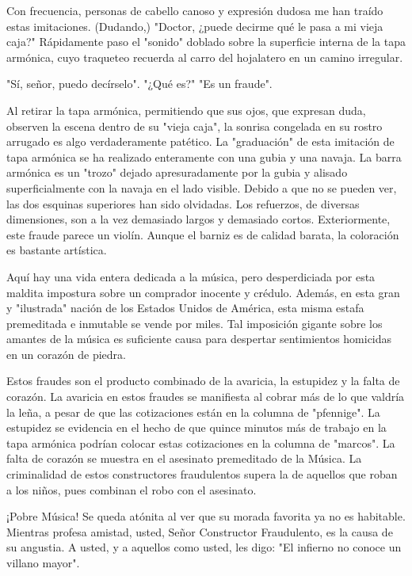 \documentclass[12pt]{book}
\begin{document}
Con frecuencia, personas de cabello canoso y expresión dudosa me han traído estas imitaciones. (Dudando,) "Doctor, ¿puede decirme qué le pasa a mi vieja caja?" Rápidamente paso el "sonido" doblado sobre la superficie interna de la tapa armónica, cuyo traqueteo recuerda al carro del hojalatero en un camino irregular.

"Sí, señor, puedo decírselo". "¿Qué es?" "Es un fraude".

Al retirar la tapa armónica, permitiendo que sus ojos, que expresan duda, observen la escena dentro de su "vieja caja", la sonrisa congelada en su rostro arrugado es algo verdaderamente patético. La "graduación" de esta imitación de tapa armónica se ha realizado enteramente con una gubia y una navaja. La barra armónica es un "trozo" dejado apresuradamente por la gubia y alisado superficialmente con la navaja en el lado visible. Debido a que no se pueden ver, las dos esquinas superiores han sido olvidadas. Los refuerzos, de diversas dimensiones, son a la vez demasiado largos y demasiado cortos. Exteriormente, este fraude parece un violín. Aunque el barniz es de calidad barata, la coloración es bastante artística.

Aquí hay una vida entera dedicada a la música, pero desperdiciada por esta maldita impostura sobre un comprador inocente y crédulo. Además, en esta gran y "ilustrada" nación de los Estados Unidos de América, esta misma estafa premeditada e inmutable se vende por miles. Tal imposición gigante sobre los amantes de la música es suficiente causa para despertar sentimientos homicidas en un corazón de piedra.

Estos fraudes son el producto combinado de la avaricia, la estupidez y la falta de corazón. La avaricia en estos fraudes se manifiesta al cobrar más de lo que valdría la leña, a pesar de que las cotizaciones están en la columna de "pfennige". La estupidez se evidencia en el hecho de que quince minutos más de trabajo en la tapa armónica podrían colocar estas cotizaciones en la columna de "marcos". La falta de corazón se muestra en el asesinato premeditado de la Música. La criminalidad de estos constructores fraudulentos supera la de aquellos que roban a los niños, pues combinan el robo con el asesinato.\newline

¡Pobre Música! Se queda atónita al ver que su morada favorita ya no es habitable. Mientras profesa amistad, usted, Señor Constructor Fraudulento, es la causa de su angustia. A usted, y a aquellos como usted, les digo: "El infierno no conoce un villano mayor".\newline
\end{document}
